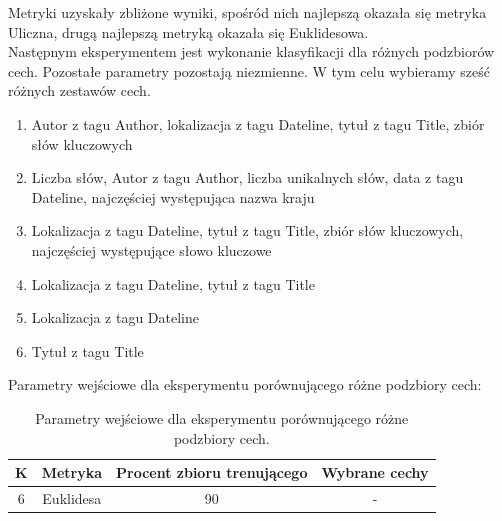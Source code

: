 \documentclass{classrep}
\begin{document}
Metryki uzyskały zbliżone wyniki, spośród nich najlepszą okazała się metryka Uliczna, drugą najlepszą metryką okazała się Euklidesowa. \\



Następnym eksperymentem jest wykonanie klasyfikacji dla różnych podzbiorów cech. Pozostałe parametry pozostają niezmienne. W tym celu wybieramy sześć różnych zestawów cech. 

\begin{enumerate}
\item Autor z tagu Author, lokalizacja z tagu Dateline, tytuł z tagu Title, zbiór słów kluczowych
\item Liczba słów, Autor z tagu Author, liczba unikalnych słów, data z tagu Dateline, najczęściej występująca nazwa kraju
\item Lokalizacja z tagu Dateline, tytuł z tagu Title, zbiór słów kluczowych, najczęściej występujące słowo kluczowe
\item Lokalizacja z tagu Dateline, tytuł z tagu Title
\item Lokalizacja z tagu Dateline
\item Tytuł z tagu Title
\end{enumerate}

Parametry wejściowe dla eksperymentu porównującego różne podzbiory cech:
 
\begin{table}[h!]
\caption{Parametry wejściowe dla eksperymentu porównującego różne podzbiory cech. }
\centering
\vspace{0.1cm}
 \begin{tabular}{c c c c}
    \textbf{K} & \textbf{Metryka}   & \textbf{Procent zbioru trenującego}  & \textbf{Wybrane cechy}   \\
\hline
6 & Euklidesa & 90 & -\\
\end {tabular}
\label {Parametry wejściowe dla eksperymentu porównującego różne podzbiory cech. }
\end{table}
\end{document}
